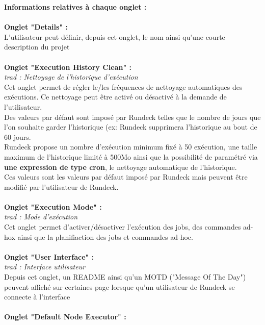 \documentclass[12pt]{article}
\begin{document}
\textbf{Informations relatives à chaque onglet :}
\\
\vspace{0.5cm}
\\
\textbf{Onglet "Details" :}
\\
L'utilisateur peut définir, depuis cet onglet, le nom ainsi qu'une courte description du projet
\\
\vspace{0.2cm}
\\
\textbf{Onglet "Execution History Clean" :}
\\
\textit{trad : Nettoyage de l'historique d'exécution}
\\
Cet onglet permet de régler le/les fréquences de nettoyage automatiques des exécutions. Ce nettoyage peut être activé ou désactivé à la demande de l'utilisateur.
\\
Des valeurs par défaut sont imposé par Rundeck telles que le nombre de jours que l'on souhaite garder l'historique (ex: Rundeck supprimera l'historique au bout de 60 jours.
\\
Rundeck propose un nombre d'exécution minimum fixé à 50 exécution, une taille maximum de l'historique limité à 500Mo ainsi que la possibilité de paramétré via \textbf{une expression de type cron}, le nettoyage automatique de l'historique.
\\
Ces valeurs sont les valeurs par défaut imposé par Rundeck mais peuvent être modifié par l'utilisateur de Rundeck.
\\
\vspace{0.2cm}
\\
\textbf{Onglet "Execution Mode" :}
\\
\textit{trad : Mode d'exécution}
\\
Cet onglet permet d'activer/désactiver l'exécution des jobs, des commandes ad-hox ainsi que la planifiaction des jobs et commandes ad-hoc.
\\
\vspace{0.2cm}
\\
\textbf{Onglet "User Interface" :}
\\
\textit{trad : Interface utilisateur}
\\
Depuis cet onglet, un README ainsi qu'un MOTD ("Message Of The Day") peuvent affiché sur certaines page lorsque qu'un utilisateur de Rundeck se connecte à l'interface
\\
\vspace{0.2cm}
\\
\textbf{Onglet "Default Node Executor" :}
\\
\end{document}
